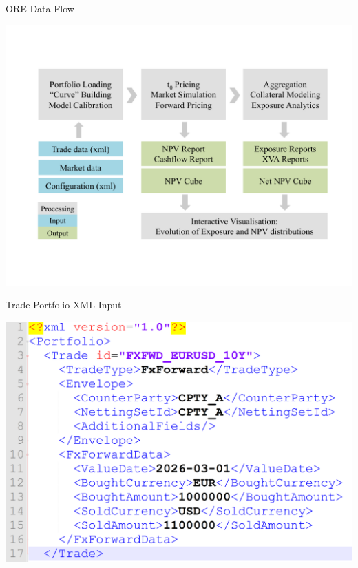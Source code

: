 \documentclass[t]{beamer}
\begin{document}
\begin{frame}{ORE Data Flow}
	\begin{center}
		\includegraphics[scale=0.5]{pics/ore_process.pdf}
	\end{center}
\end{frame}

\begin{frame}{Trade Portfolio XML Input}
	\begin{center}
		\includegraphics[scale=0.4]{pics/input_xml.png}
	\end{center}
\end{frame}
\end{document}
